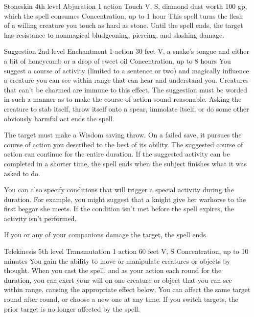 \documentclass[10pt,a4paper,twoside,bg=print,twocolumn,openany,nodeprecatedcode]{dndbook}
\begin{document}


\DndSpellHeader%
{Stoneskin}
{4th level Abjuration}
{1 action}
{Touch}
{V, S, diamond dust worth 100 gp, which the spell consumes}
{Concentration, up to 1 hour}
This spell turns the flesh of a willing creature you touch as hard as stone. Until the spell ends, the target has resistance to nonmagical bludgeoning, piercing, and slashing damage.



\DndSpellHeader%
{Suggestion}
{2nd level Enchantment}
{1 action}
{30 feet}
{V, a snake's tongue and either a bit of honeycomb or a drop of sweet oil}
{Concentration, up to 8 hours}
You suggest a course of activity (limited to a sentence or two) and magically influence a creature you can see within range that can hear and understand you. Creatures that can't be charmed are immune to this effect. The suggestion must be worded in such a manner as to make the course of action sound reasonable. Asking the creature to stab itself, throw itself onto a spear, immolate itself, or do some other obviously harmful act ends the spell.

The target must make a Wisdom saving throw. On a failed save, it pursues the course of action you described to the best of its ability. The suggested course of action can continue for the entire duration. If the suggested activity can be completed in a shorter time, the spell ends when the subject finishes what it was asked to do.

You can also specify conditions that will trigger a special activity during the duration. For example, you might suggest that a knight give her warhorse to the first beggar she meets. If the condition isn't met before the spell expires, the activity isn't performed.

If you or any of your companions damage the target, the spell ends.



\DndSpellHeader%
{Telekinesis}
{5th level Transmutation}
{1 action}
{60 feet}
{V, S}
{Concentration, up to 10 minutes}
You gain the ability to move or manipulate creatures or objects by thought. When you cast the spell, and as your action each round for the duration, you can exert your will on one creature or object that you can see within range, causing the appropriate effect below. You can affect the same target round after round, or choose a new one at any time. If you switch targets, the prior target is no longer affected by the spell.
\end{document}
